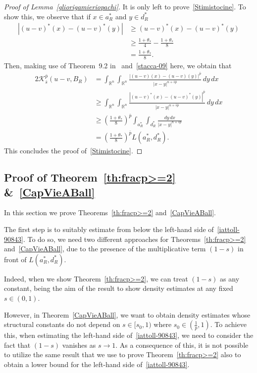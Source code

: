 \documentclass[12pt]{article}
\newcommand{\R}{\mathbb{R}}
\numberwithin{equation}{section}
\renewcommand{\geq}{\geqslant}
\begin{document}
\begin{proof}[Proof of Lemma~\ref{gliorigamieriopachi}]
It is only left to prove~\eqref{Stimistocine}. To show this, we observe that if $x\in a_R^*$ and $y\in d_R^*$ 
\begin{equation}\label{stacca-09}
\begin{split}
\left|(u-v)^*(x)-(u-v)^*(y)\right| &\geq (u-v)^*(x)-(u-v)^*(y)\\
&\geq \frac{1+\theta_*}{4}-\frac{1+\theta_*}{8}\\
&=\frac{1+\theta_*}{8}. 
\end{split}
\end{equation}
Then, making use of Theorem~9.2 in~\cite{MR1002633} and~\eqref{stacca-09} here, we obtain that
\begin{equation*}\label{EsOnThKiTe}
\begin{split}
2\mathcal{K}_{\bar{s}}^{\bar{p}}\left(u-v,B_R\right) & =\int_{\R^n}\int_{\R^n} \frac{\left|(u-v)(x)-(u-v)(y)\right|^{\bar{p}}}{\left|x-y\right|^{n+\bar{s}\bar{p}}}\,dy\,dx\\
& \geq \int_{\R^n}\int_{\R^n} \frac{\left|(u-v)^*(x)-(u-v)^*(y)\right|^{\bar{p}}}{\left|x-y\right|^{n+\bar{s}\bar{p}}}\,dy\,dx\\
&\geq \left(\frac{1+\theta_*}{8}\right)^{\bar{p}}\int_{a_R^*}\int_{d_R^*} \frac{dy\,dx}{\left|x-y\right|^{n+sp}}\\ 
&=\left(\frac{1+\theta_*}{8}\right)^{\bar{p}}L(a_R^*,d_R^*). 
\end{split}
\end{equation*}
This concludes the proof of~\eqref{Stimistocine}. 
\end{proof}


\subsection{Proof of Theorem~\ref{th:fracp>=2} \&~\ref{CapVieABall}}\label{kovbreclo865r}
In this section we prove Theorems~\ref{th:fracp>=2} and~\ref{CapVieABall}.

The first step  is to suitably estimate from below the left-hand side of~\eqref{iattoll-90843}. To do so, we need two different approaches for Theorems~\ref{th:fracp>=2} and~\ref{CapVieABall}, due to the presence of the multiplicative term $(1-s)$ in front of $L(a_R^*,d_R^*)$. 

Indeed, when we show Theorem~\ref{th:fracp>=2}, we can treat $(1-s)$ as any constant, being the aim of the result to show density estimates at any fixed $s\in (0,1)$. 

However, in Theorem~\ref{CapVieABall}, we want to obtain density estimates whose structural constants do not depend on $s\in [s_0,1)$ where $s_0\in \left(\frac{1}{p},1\right)$. To achieve this, when estimating the left-hand side of~\eqref{iattoll-90843}, we need to consider the fact that $(1-s)$ vanishes as $s\to 1$. As a consequence of this, it is not possible to utilize the same result that we use to prove Theorem~\ref{th:fracp>=2} also to obtain a lower bound for the left-hand side of~\eqref{iattoll-90843}.  
\end{document}
